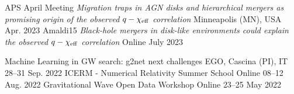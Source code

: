 

\begin{cventries}

\cventry
{APS April Meeting}
{\emph{Migration traps in AGN disks and hierarchical mergers as promising origin of the observed $q-\chi_{\rm eff}$ correlation}}
{Minneapolis (MN), USA}
{Apr. 2023}
{}
\cventry
{Amaldi15}
{\emph{Black-hole mergers in disk-like environments could explain the observed $q-\chi_{\rm eff}$ correlation}}
{Online}
{July 2023}
{}
\end{cventries}

\newpage


\begin{cventries}

\cventry
{Machine Learning in GW search: g2net next challenges}
{}
{EGO, Cascina (PI), IT}
{28--31 Sep. 2022}
{}
\vspace{-3mm}
\cventry
{ICERM - Numerical Relativity Summer School}
{}
{Online}
{08--12 Aug. 2022}
{}
\vspace{-3mm}
\cventry
{Gravitational Wave Open Data Workshop}
{}
{Online}
{23--25 May 2022}
{}
\end{cventries}